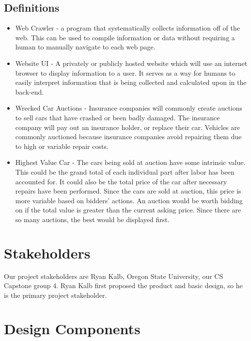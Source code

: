 \documentclass[onecolumn, draftclsnofoot, 10pt, compsoc]{IEEEtran}
\begin{document}
\subsection{Definitions}
\begin{itemize}

\item Web Crawler - a program that systematically collects information off of the web. This can be used to compile information or data without requiring a human to manually navigate to each web page. 

\item Website UI - A privately or publicly hosted website which will use an internet browser to display information to a user. It serves as a way for humans to easily interpret information that is being collected and calculated upon in the back-end. 

\item Wrecked Car Auctions - Insurance companies will commonly create auctions to sell cars that have crashed or been badly damaged. The insurance company will pay out an insurance holder, or replace their car. Vehicles are commonly auctioned because insurance companies avoid repairing them due to high or variable repair costs. 

\item Highest Value Car - The cars being sold at auction have some intrinsic value. This could be the grand total of each individual part after labor has been accounted for. It could also be the total price of the car after necessary repairs have been performed. Since the cars are sold at auction, this price is more variable based on bidders' actions. An auction would be worth bidding on if the total value is greater than the current asking price. Since there are so many auctions, the best would be displayed first.

\end{itemize}


\section{Stakeholders}
Our project stakeholders are Ryan Kalb, Oregon State University, our CS Capstone group 4. Ryan Kalb first proposed the product and basic design, so he is the primary project stakeholder. 

\section{Design Components}
\end{document}

